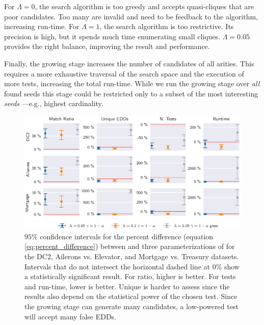 \medskip

For $\Lambda = 0$, the search algorithm is too greedy and accepts quasi-cliques that are poor candidates.
Too many are invalid and need to be feedback to the algorithm, increasing run-time.
For $\Lambda = 1$, the search algorithm is too restrictive. Its precision is high,
but it spends much time enumerating small cliques. $\Lambda = 0.05$ provides the right balance,
improving the result and performance.

Finally, the growing stage increases the number of candidates of all arities.
This requires a more exhaustive traversal of the search space and the execution of more tests,
increasing the total run-time. While we run the growing stage over
\emph{all} found seeds this stage could be restricted only
to a subset of the most interesting \emph{seeds} ---e.g., highest cardinality.

\begin{figure}[t]
    \centering
    \includegraphics[width=\linewidth]{images/presq/all}
    \caption{
        $95\%$ confidence intervals for the percent difference
        (equation \ref{eq:percent_difference}) between \Find and
        three parameterizations of \PresQ for the DC2, Ailerons vs. Elevator, and
        Mortgage vs. Treasury datasets.
        Intervals that do not intersect the horizontal dashed line at $0\%$  show a statistically
        significant result.
        For ratio, higher is better. For tests and run-time, lower is better. Unique is harder to
        assess since the results also depend on the statistical power of the chosen test.
        Since the growing stage can generate many candidates, a low-powered test will accept
        many false EDDs.
    }
    \label{fig:results_summary}
\end{figure}

